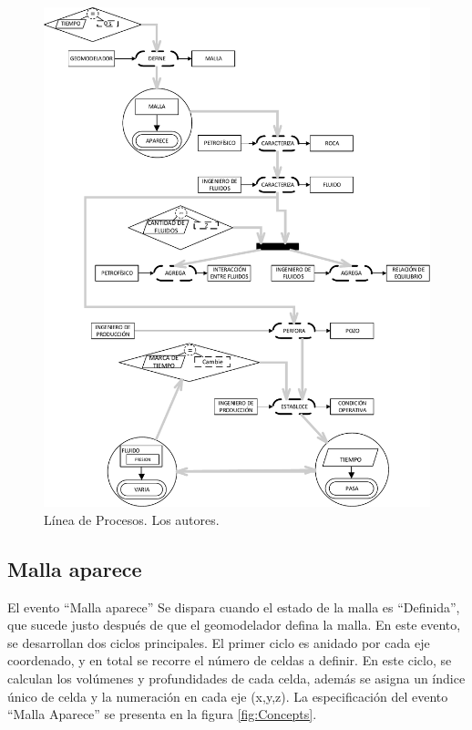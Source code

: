 \begin{figure}[b]
	\centering%
	\includegraphics[width=0.9\linewidth]{Fig/FlujoDeEventos.pdf}%
	\caption{Línea de Procesos. Los autores.} \label{fig:Events}
\end{figure}
\subsection{Malla aparece}
El evento ``Malla aparece'' Se dispara cuando el estado de la malla es ``Definida'', que sucede justo después de que el geomodelador defina la malla. En este evento, se desarrollan dos ciclos principales. El primer ciclo es anidado por cada eje coordenado, y en total se recorre el número de celdas a definir. En este ciclo, se calculan los volúmenes y profundidades de cada celda, además se asigna un índice único de celda y la numeración en cada eje (x,y,z). La especificación del evento ``Malla Aparece'' se presenta en la figura \ref{fig:Concepts}.\\

